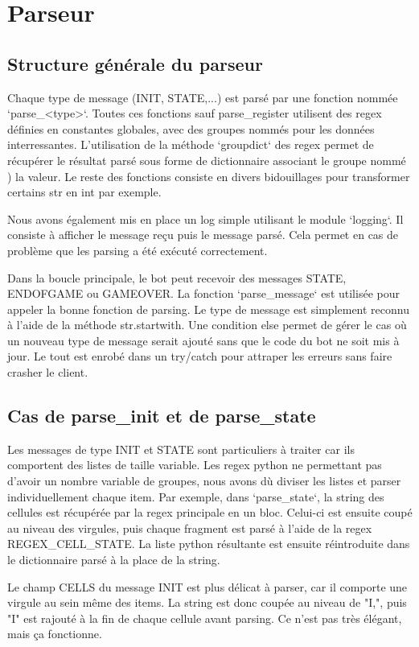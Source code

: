 \documentclass{rapport}
\begin{document}
		\section{Parseur}
			\subsection{Structure générale du parseur}
Chaque type de message (INIT, STATE,...) est parsé par une fonction nommée
`parse\_<type>`. Toutes ces fonctions sauf parse\_register utilisent des regex
définies en constantes globales, avec des groupes nommés pour les données
interressantes. L'utilisation de la méthode `groupdict` des regex permet de
récupérer le résultat parsé sous forme de dictionnaire associant le groupe nommé
) la valeur. Le reste des fonctions consiste en divers bidouillages pour
transformer certains str en int par exemple.

Nous avons également mis en place un log simple utilisant le module `logging`.
Il consiste à afficher le message reçu puis le message parsé. Cela permet en cas
de problème que les parsing a été exécuté correctement.

Dans la boucle principale, le bot peut recevoir des messages STATE, ENDOFGAME ou
GAMEOVER. La fonction `parse\_message` est utilisée pour appeler la bonne
fonction de parsing. Le type de message est simplement reconnu à l'aide de la
méthode str.startwith. Une condition else permet de gérer le cas où un nouveau
type de message serait ajouté sans que le code du bot ne soit mis à jour. Le
tout est enrobé dans un try/catch pour attraper les erreurs sans faire crasher
le client.
			\subsection{Cas de parse\_init et de parse\_state}
Les messages de type INIT et STATE sont particuliers à traiter car ils
comportent des listes de taille variable. Les regex python ne permettant pas
d'avoir un nombre variable de groupes, nous avons dù diviser les listes et
parser individuellement chaque item. Par exemple, dans `parse\_state`, la string
des cellules est récupérée par la regex principale en un bloc. Celui-ci est
ensuite coupé au niveau des virgules, puis chaque fragment est parsé à l'aide de
la regex REGEX\_CELL\_STATE. La liste python résultante est ensuite réintroduite
dans le dictionnaire parsé à la place de la string.

Le champ CELLS du message INIT est plus délicat à parser, car il comporte une
virgule au sein même des items. La string est donc coupée au niveau de "I,",
puis "I" est rajouté à la fin de chaque cellule avant parsing. Ce n'est pas très
élégant, mais ça fonctionne.
\end{document}
